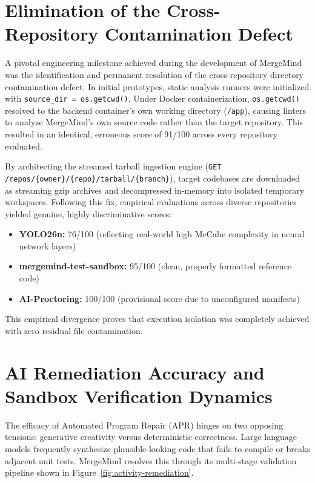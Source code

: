 \documentclass[12pt,a4paper,oneside]{report}
\begin{document}
\section{Elimination of the Cross-Repository Contamination Defect}
\label{sec:disc-contamination}

A pivotal engineering milestone achieved during the development of MergeMind was the identification and permanent resolution of the cross-repository directory contamination defect. In initial prototypes, static analysis runners were initialized with \texttt{source\_dir = os.getcwd()}. Under Docker containerization, \texttt{os.getcwd()} resolved to the backend container's own working directory (\texttt{/app}), causing linters to analyze MergeMind's own source code rather than the target repository. This resulted in an identical, erroneous score of 91/100 across every repository evaluated.

By architecting the streamed tarball ingestion engine (\texttt{GET /repos/\{owner\}/\{repo\}/tarball/\{branch\}}), target codebases are downloaded as streaming gzip archives and decompressed in-memory into isolated temporary workspaces. Following this fix, empirical evaluations across diverse repositories yielded genuine, highly discriminative scores:
\begin{itemize}
    \item \textbf{YOLO26n:} 76/100 (reflecting real-world high McCabe complexity in neural network layers)
    \item \textbf{mergemind-test-sandbox:} 95/100 (clean, properly formatted reference code)
    \item \textbf{AI-Proctoring:} 100/100 (provisional score due to unconfigured manifests)
\end{itemize}
This empirical divergence proves that execution isolation was completely achieved with zero residual file contamination.

\section{AI Remediation Accuracy and Sandbox Verification Dynamics}
\label{sec:disc-remediation-accuracy}

The efficacy of Automated Program Repair (APR) hinges on two opposing tensions: generative creativity versus deterministic correctness. Large language models frequently synthesize plausible-looking code that fails to compile or breaks adjacent unit tests. MergeMind resolves this through its multi-stage validation pipeline shown in Figure~\ref{fig:activity-remediation}.
\end{document}
